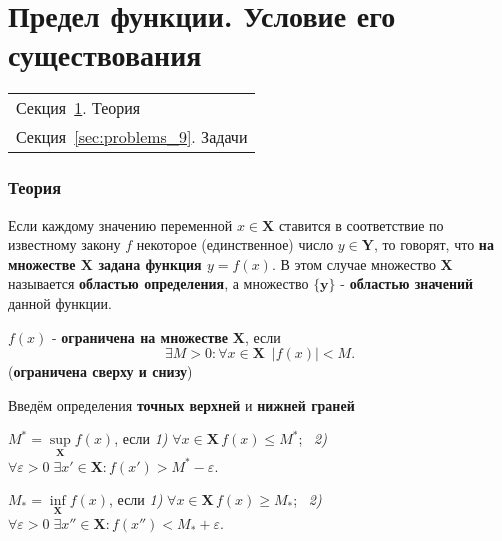 \documentclass[10pt]{article}
\begin{document}
\setcounter{footnote}{0}

\setcounter{section}{0}

\setcounter{part}{8}
	\flushbottom
	\newpage
	\pagestyle{fancynotes}
	\part[Предел функции. Условие его существования]{Предел функции. Условие его существования}
	\begin{margintable}\vspace{.8in}\footnotesize
		\begin{tabularx}{\marginparwidth}{|X}
		Секция~\ref{sec:theory_9}. Теория\\
		Секция~\ref{sec:problems_9}. Задачи\\
		\end{tabularx}
	\end{margintable}
	\section[Теория]{Теория}\label{sec:theory_9}

\begin{definition}
Если каждому значению переменной $x\in\textbf{X}$ ставится в соответствие по известному закону $f$ некоторое (единственное) число $y\in \textbf{Y}$, то говорят, что  \textbf{на множестве $\textbf{X}$ задана функция $y = f(x)$}. В этом случае множество $\textbf{X}$ называется \textbf{областью определения}, а множество $\textbf{\{y\}}$ - \textbf{областью значений} данной функции.
\end{definition}

\begin{definition}
$f(x)$ - \textbf{ограничена на множестве} \textbf{X}, если 
$$\exists M>0 : \forall x\in \textbf{X} \,\,\, |f(x)|<M.$$ (\textbf{ограничена сверху и снизу})
\end{definition}

\begin{definition} Введём определения \textbf{точных верхней} и \textbf{нижней граней}

\medskip

$M^* \!= \sup\limits_\textbf{X}\!f(x)$, если 
\emph{1)} $\forall x \in \textbf{X} \, f(x) \leqslant M^*$; \, \emph{2)} $\forall \varepsilon > 0 \; \exists x' \in \textbf{X}: f(x') > M^* - \varepsilon$.

\medskip

$M_*=\inf\limits_\textbf{X}\! f(x)$, если 
\emph{1)}  $\forall x \in \textbf{X} \, f(x)\geqslant M_*$;
\, \emph{2)} $\forall \varepsilon > 0 \; \exists x''\in \textbf{X} : f(x'') < M_* + \varepsilon$.
\end{definition}
\end{document}
